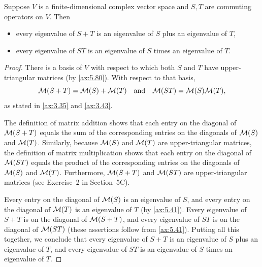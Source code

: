 \begin{result}\label{ax:5.81}
Suppose $V$ is a finite-dimensional complex vector space and $S,T$ are
commuting operators on $V$. Then
\begin{itemize}
\item every eigenvalue of $S+T$ is an eigenvalue of $S$ plus an eigenvalue of
  $T$,
\item every eigenvalue of $ST$ is an eigenvalue of $S$ times an eigenvalue of
  $T$.
\end{itemize}
\end{result}

\begin{proof}
There is a basis of $V$ with respect to which both $S$ and $T$ have
upper-triangular matrices (by \ref{ax:5.80}). With respect to that basis,
\[ \mathcal{M}(S+T) = \mathcal{M}(S)+\mathcal{M}(T) \quad\text{and}\quad \mathcal{M}(ST) = \mathcal{M}(S)\mathcal{M}(T), \]
as stated in \ref{ax:3.35} and \ref{ax:3.43}.

The definition of matrix addition shows that each entry on the diagonal of
$\mathcal{M}(S+T)$ equals the sum of the corresponding entries on the diagonals of
$\mathcal{M}(S)$ and $\mathcal{M}(T)$. Similarly, because $\mathcal{M}(S)$ and $\mathcal{M}(T)$ are
upper-triangular matrices, the definition of matrix multiplication shows that
each entry on the diagonal of $\mathcal{M}(ST)$ equals the product of the
corresponding entries on the diagonals of $\mathcal{M}(S)$ and $\mathcal{M}(T)$.
Furthermore, $\mathcal{M}(S+T)$ and $\mathcal{M}(ST)$ are upper-triangular matrices (see
Exercise~2 in Section~5C).

Every entry on the diagonal of $\mathcal{M}(S)$ is an eigenvalue of $S$, and every
entry on the diagonal of $\mathcal{M}(T)$ is an eigenvalue of $T$ (by \ref{ax:5.41}).
Every eigenvalue of $S+T$ is on the diagonal of $\mathcal{M}(S+T)$, and every
eigenvalue of $ST$ is on the diagonal of $\mathcal{M}(ST)$ (these assertions follow
from \ref{ax:5.41}). Putting all this together, we conclude that every
eigenvalue of $S+T$ is an eigenvalue of $S$ plus an eigenvalue of $T$, and
every eigenvalue of $ST$ is an eigenvalue of $S$ times an eigenvalue of $T$.
\end{proof}


